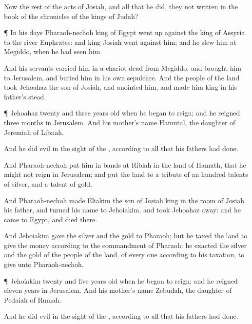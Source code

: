 {Now the
rest of the
acts of
Josiah, and all that he
did,
{} they not
written in the
book of the
chronicles of the
kings of
Judah?


\par }{\PP {}¶ In his
days
Pharaoh-nechoh
king of
Egypt went
up against the
king of
Assyria to the
river
Euphrates: and
king
Josiah
went
against him; and he
slew him at
Megiddo, when he had
seen him.

And his
servants carried him in a
chariot
dead from
Megiddo, and
brought him to
Jerusalem, and
buried him in his own
sepulchre. And the
people of the
land
took
Jehoahaz the
son of
Josiah, and
anointed him, and made him
king in his
father’s stead.


\par }{\PP {}¶
Jehoahaz
{}
twenty and
three
years
old when he began to
reign; and he
reigned
three
months in
Jerusalem. And his
mother’s
name
{}
Hamutal, the
daughter of
Jeremiah of
Libnah.

And he
did
{}
evil in the
sight of the
{}, according to all that his
fathers had
done.

And
Pharaoh-nechoh put him in
bands at
Riblah in the
land of
Hamath, that he might not
reign in
Jerusalem; and
put the
land to a
tribute of an
hundred
talents of
silver, and a
talent of
gold.

And
Pharaoh-nechoh made
Eliakim the
son of
Josiah
king in the room of
Josiah his
father, and
turned his
name to
Jehoiakim, and
took
Jehoahaz
away: and he
came to
Egypt, and
died there.

And
Jehoiakim
gave the
silver and the
gold to
Pharaoh; but he
taxed the
land to
give the
money according to the
commandment of
Pharaoh: he
exacted the
silver and the
gold of the
people of the
land, of every
one according to his
taxation, to
give
{} unto
Pharaoh-nechoh.


\par }{\PP {}¶
Jehoiakim
{}
twenty and
five
years
old when he began to
reign; and he
reigned
eleven
years in
Jerusalem. And his
mother’s
name
{}
Zebudah, the
daughter of
Pedaiah of
Rumah.

And he
did
{}
evil in the
sight of the
{}, according to all that his
fathers had
done.




}
